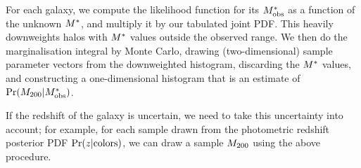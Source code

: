 \documentclass[useAMS,usenatbib]{mn2e}
\begin{document}
For each galaxy, we compute the likelihood function for its $M^{*}_{\rm obs}$ as a
function of the unknown $M^{*}$, and multiply it by our tabulated joint PDF.
This heavily downweights halos with $M^{*}$ values outside the observed
range. We then do the marginalisation integral by Monte Carlo, drawing
(two-dimensional) sample parameter vectors
from the downweighted histogram, discarding the $M^{*}$ values, and
constructing a one-dimensional histogram that is an estimate of
$\Pr(M_{200}|M^{*}_{\rm obs})$.

If the redshift of the galaxy is uncertain, we need to take this
uncertainty into account; for example, for each sample drawn from the
photometric redshift posterior PDF $\Pr(z|{\rm colors})$, we can draw a
sample $M_{200}$ using the above procedure.



% 

% 
% 




\label{lastpage}
\bsp
\end{document}
